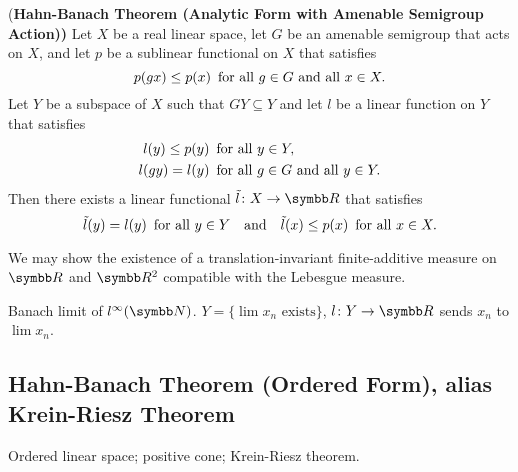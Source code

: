 \begin{theorem}{(\bf Hahn-Banach Theorem (Analytic Form with Amenable Semigroup Action))}
  Let $X$ be a real linear space, let $G$ be an amenable semigroup that acts on $X$, and let $p$ be a sublinear functional on $X$ that satisfies
  \begin{equation*}
    p(gx)\leq p(x) \text{\enskip for all } g\in G \text{ and all } x\in X.
  \end{equation*}
  Let $Y$ be a subspace of $X$ such that $GY\subseteq Y$ and let $l$ be a linear function on $Y$ that satisfies
  \begin{equation*}
    \begin{aligned}
      l(y)\leq p(y) &\text{\enskip for all } y\in Y,\\
      l(gy)=l(y)&\text{\enskip for all } g\in G \text{ and all }y\in Y.
    \end{aligned}
  \end{equation*}
  Then there exists a linear functional $\tilde l\colon X\to\RR$ that satisfies
  \begin{equation*}
    \tilde l(y)=l(y)\text{\enskip for all }y\in Y\text{\quad and\quad} \tilde l(x)\leq p(x) \text{\enskip for all } x\in X.
  \end{equation*}
\end{theorem}

\begin{example}
  We may show the existence of a translation-invariant finite-additive measure on $\RR$ and $\RR^2$ compatible with the Lebesgue measure.
\end{example}

\begin{example}
  Banach limit of $l^\infty(\NN)$. $Y=\{\lim x_n \text{ exists}\}$, $l\colon Y\to\RR$ sends $x_n$ to $\lim x_n$.
\end{example}

\subsection{Hahn-Banach Theorem (Ordered Form), alias Krein-Riesz Theorem}

Ordered linear space; positive cone; Krein-Riesz theorem.

